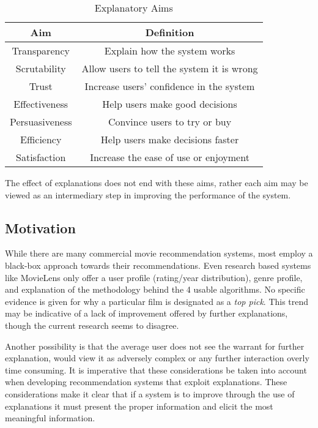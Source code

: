 \documentclass[letterpaper, 10 pt, conference]{ieeeconf}  %
\begin{document}
\begin{table}[h]
\caption{Explanatory Aims}
\centering
\label{table_example}
\begin{center}
\begin{tabular}{c c}
\hline
Aim & Definition\\
\hline
Transparency & Explain how the system works\\

Scrutability & Allow users to tell the system it is wrong\\

Trust & Increase users’ confidence in the system\\

Effectiveness & Help users make good decisions\\

Persuasiveness & Convince users to try or buy\\

Efficiency & Help users make decisions faster\\

Satisfaction & Increase the ease of use or enjoyment\\
\hline
\end{tabular}
\end{center}
\end{table}

The effect of explanations does not end with these aims, rather each aim may be viewed as an intermediary step in improving the performance of the system.
\subsection{Motivation}
While there are many commercial movie recommendation systems, most employ a black-box approach towards their recommendations. Even research based systems like MovieLens only offer a user profile (rating/year distribution), genre profile, and explanation of the methodology behind the 4 usable algorithms. No specific evidence is given for why a particular film is designated as a \textit{top pick}. This trend may be indicative of a lack of improvement offered by further explanations, though the current research seems to disagree. 

Another possibility is that the average user does not see the warrant for further explanation, would view it as adversely complex or any further interaction overly time consuming. It is imperative that these considerations be taken into account when developing recommendation systems that exploit explanations. These considerations make it clear that if a system is to improve through the use of explanations it must present the proper information and elicit the most meaningful information.
\end{document}
